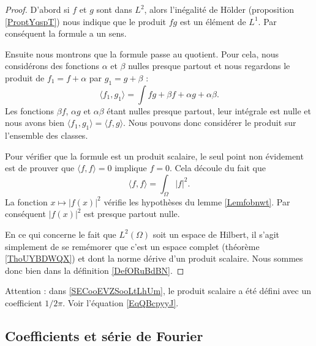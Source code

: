 \begin{proof}
    D'abord si \( f\) et \( g\) sont dans \( L^2\), alors l'inégalité de Hölder (proposition \ref{ProptYqspT}) nous indique que le produit \( fg\) est un élément de \( L^1\). Par conséquent la formule a un sens.

    Ensuite nous montrons que la formule passe au quotient. Pour cela, nous considérons des fonctions \( \alpha\) et \( \beta\) nulles presque partout et nous regardons le produit de \( f_1=f+\alpha\) par \( g_1=g+\beta\) :
    \begin{equation}
        \langle f_1, g_1\rangle =\int fg+\beta f+\alpha g+ \alpha\beta.
    \end{equation}
    Les fonctions \( \beta f\), \( \alpha g\) et \( \alpha\beta\) étant nulles presque partout, leur intégrale est nulle et nous avons bien \( \langle f_1, g_1\rangle =\langle f,g \rangle \). Nous pouvons donc considérer le produit sur l'ensemble des classes.

    Pour vérifier que la formule est un produit scalaire, le seul point non évidement est de prouver que \( \langle f, f\rangle =0\) implique \( f=0\). Cela découle du fait que
    \begin{equation}
        \langle f, f\rangle =\int_{\Omega}| f |^2.
    \end{equation}
    La fonction \( x\mapsto | f(x) |^2\) vérifie les hypothèses du lemme \ref{Lemfobnwt}. Par conséquent \( | f(x) |^2\) est presque partout nulle.

    En ce qui concerne le fait que \( L^2(\Omega)\) soit un espace de Hilbert, il s'agit simplement de se remémorer que c'est un espace complet (théorème  \ref{ThoUYBDWQX}) et dont la norme dérive d'un produit scalaire. Nous sommes donc bien dans la définition \ref{DefORuBdBN}.
\end{proof}

Attention : dans \ref{SECooEVZSooLtLhUm}, le produit scalaire a été défini
avec un coefficient \( 1/2\pi\). Voir l'équation \eqref{EqQBcpyyJ}.

\subsection{Coefficients et série de Fourier}
\label{subSecXAYasNI}

